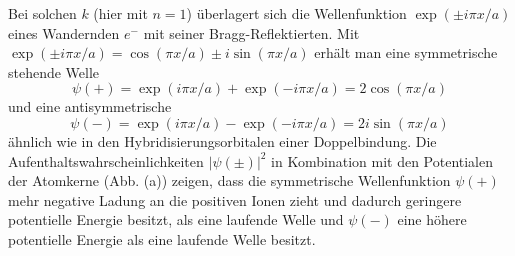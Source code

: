 Bei solchen $k$ (hier mit $n=1$) überlagert sich die Wellenfunktion $\exp(\pm i \pi x / a)$ eines Wandernden $e^-$ mit seiner Bragg-Reflektierten.
Mit $\exp(\pm i \pi x / a) = \cos(\pi x/a) \pm i \sin(\pi x/a)$ erhält man eine symmetrische stehende Welle
\begin{equation}
    \psi(+) = \exp( i \pi x / a) + \exp(- i \pi x / a) = 2\cos(\pi x/a)
\end{equation}
und eine antisymmetrische
\begin{equation}
    \psi(-) = \exp( i \pi x / a) - \exp(- i \pi x / a) = 2 i \sin(\pi x/a)
\end{equation}
ähnlich wie in den Hybridisierungsorbitalen einer Doppelbindung.
Die Aufenthaltswahrscheinlichkeiten $\left|\psi(\pm)\right|^2$ in Kombination mit den Potentialen der Atomkerne (Abb. (a)) zeigen, dass die symmetrische Wellenfunktion $\psi(+)$ mehr negative Ladung an die positiven Ionen zieht und dadurch geringere potentielle Energie besitzt, als eine laufende Welle und $\psi(-)$ eine höhere potentielle Energie als eine laufende Welle besitzt.
